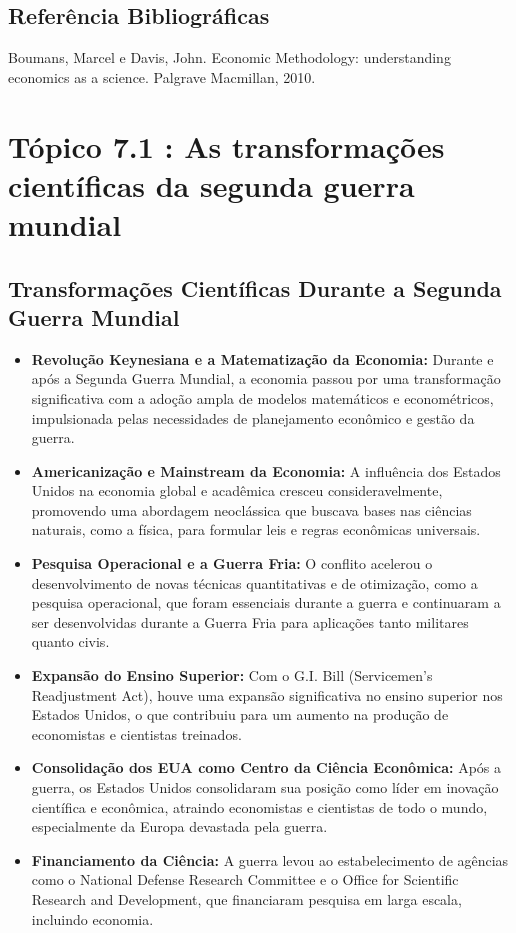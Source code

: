 \documentclass[a4paper,12pt]{article}[abntex2]
\begin{document}
\subsection{\textbf{Referência Bibliográficas}}
Boumans, Marcel e Davis, John. Economic Methodology: understanding economics as a
science. Palgrave Macmillan, 2010.

\newpage
\section{\textbf{Tópico 7.1 : As transformações científicas da segunda guerra mundial}}
\subsection{Transformações Científicas Durante a Segunda Guerra Mundial}
\begin{itemize}
  \item \textbf{Revolução Keynesiana e a Matematização da Economia:} Durante e após a Segunda Guerra Mundial, a economia passou por uma transformação significativa com a adoção ampla de modelos matemáticos e econométricos, impulsionada pelas necessidades de planejamento econômico e gestão da guerra.
  \item \textbf{Americanização e Mainstream da Economia:} A influência dos Estados Unidos na economia global e acadêmica cresceu consideravelmente, promovendo uma abordagem neoclássica que buscava bases nas ciências naturais, como a física, para formular leis e regras econômicas universais.
  \item \textbf{Pesquisa Operacional e a Guerra Fria:} O conflito acelerou o desenvolvimento de novas técnicas quantitativas e de otimização, como a pesquisa operacional, que foram essenciais durante a guerra e continuaram a ser desenvolvidas durante a Guerra Fria para aplicações tanto militares quanto civis.
  \item \textbf{Expansão do Ensino Superior:} Com o G.I. Bill (Servicemen's Readjustment Act), houve uma expansão significativa no ensino superior nos Estados Unidos, o que contribuiu para um aumento na produção de economistas e cientistas treinados.
  \item \textbf{Consolidação dos EUA como Centro da Ciência Econômica:} Após a guerra, os Estados Unidos consolidaram sua posição como líder em inovação científica e econômica, atraindo economistas e cientistas de todo o mundo, especialmente da Europa devastada pela guerra.
  \item \textbf{Financiamento da Ciência:} A guerra levou ao estabelecimento de agências como o National Defense Research Committee e o Office for Scientific Research and Development, que financiaram pesquisa em larga escala, incluindo economia.
\end{itemize}
\end{document}
